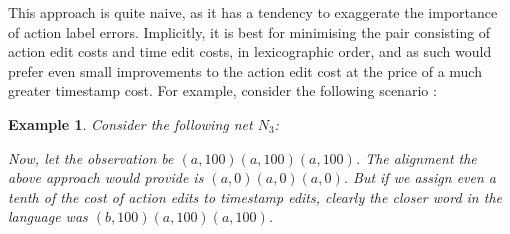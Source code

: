 \documentclass[conference]{IEEEtran}
\newcommand\eye{\ensurestackMath{\stackinset{c}{}{c}{-.33pt}%
		{\bullet}{\bigcirc}}}
\newtheorem{example}{Example}
\begin{document}
		This approach is quite naive, as it has a tendency to exaggerate the importance of action label errors. 
		Implicitly, it is best for minimising the pair consisting of action edit costs and time edit costs, in lexicographic order, and as such would prefer even small improvements to the action edit cost at the price of a much greater timestamp cost. 
		For example, consider the following scenario : 
		
		\begin{example}
			Consider the following net $N_3$: \\
			\adjustbox{scale=0.8}{
				\begin{tikzcd}
					\eye & {\fbox{\strut a}} & \bigcirc & {\fbox{\strut a}} & \bigcirc & {\fbox{\strut a}} &\bigcirc \\
					& {\fbox{\strut b}} & \bigcirc & {\fbox{\strut a}} & \bigcirc & {\fbox{\strut a}} \\
					\arrow[from=1-1, to=1-2]
					\arrow[curve={height=12pt}, from=1-1, to=2-2]
					\arrow[from=1-2, to=1-3]
					\arrow[from=1-3, to=1-4]
					\arrow[from=1-4, to=1-5]
					\arrow[from=1-5, to=1-6]
					\arrow[from=1-6, to=1-7]
					\arrow[from=2-2, to=2-3]
					\arrow[from=2-3, to=2-4]
					\arrow[from=2-4, to=2-5]
					\arrow[from=2-5, to=2-6]
					\arrow[curve={height=12pt}, from=2-6, to=1-7]
					\arrow["{[0,0]}"{description, pos=0.1}, draw=white, from=1-2, to=2-2]
					\arrow["{[0,0]}"{description, pos=0.1}, draw=white, from=1-4, to=2-4]
					\arrow["{[0,0]}"{description, pos=0.1}, draw=white, from=1-6, to=2-6]
					\arrow["{[100,100]}"{description, pos=0.1}, draw=white, from=2-2, to=1-2]
					\arrow["{[0,0]}"{description, pos=0.1}, draw=white, from=2-4, to=1-4]
					\arrow["{[0,0]}"{description, pos=0.1}, draw=white, from=2-6, to=1-6]
			\end{tikzcd}}
			
			Now, let the observation be ${(a, 100)(a, 100)(a, 100)}$. 
			The alignment the above approach would provide is $(a, 0)(a, 0)(a, 0)$. 
			But if we assign even a tenth of the cost of action edits to timestamp edits, clearly the closer word in the language was $(b, 100)(a, 100)(a, 100)$. 
		\end{example}
\end{document}

